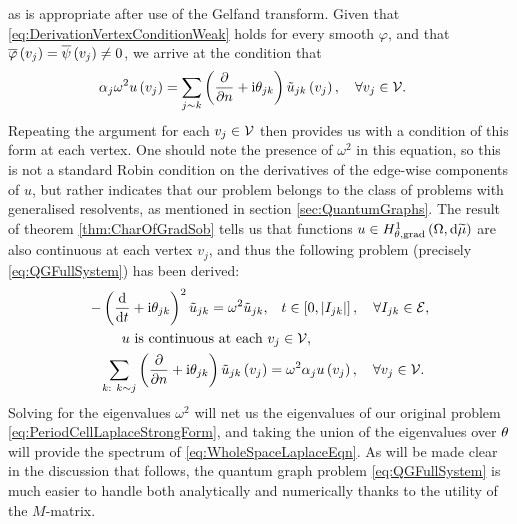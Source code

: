 as is appropriate after use of the Gelfand transform.
Given that \eqref{eq:DerivationVertexConditionWeak} holds for every smooth $\varphi$, and that $\overline{\varphi}\left( v_j \right)=\overline{\psi}\left( v_j \right)\neq 0$, we arrive at the condition that
\begin{align*}
	\alpha_j\omega^2 u\left( v_j \right) &= \sum_{j\sim k}\left( \dfrac{\partial }{\partial n} + \mathrm{i}\theta_{jk} \right)\tilde{u}_{jk}\left( v_j \right), \quad \forall v_j \in \mathcal{V}.
\end{align*}
Repeating the argument for each $v_j\in \mathcal{V}$ then provides us with a condition of this form at each vertex.
One should note the presence of $\omega^2$ in this equation, so this is not a standard Robin condition on the derivatives of the edge-wise components of $u$, but rather indicates that our problem belongs to the class of problems with generalised resolvents, as mentioned in section \ref{sec:QuantumGraphs}.
The result of theorem \ref{thm:CharOfGradSob} tells us that functions $u\in H^1_{\theta, \mathrm{grad}}\left( \Omega, \mathrm{d}\widetilde{\mu} \right)$ are also continuous at each vertex $v_j$, and thus the following problem (precisely \eqref{eq:QGFullSystem}) has been derived:
\begin{align*}
	-\left( \dfrac{\mathrm{d}}{\mathrm{d}t} + \mathrm{i}\theta_{jk} \right)^2 \tilde{u}_{jk} = \omega^2 \tilde{u}_{jk}, &\quad t\in\left[ 0,\left\lvert I_{jk} \right\rvert \right], \quad \forall I_{jk}\in \mathcal{E}, \\
	u \text{ is continuous at each } &v_j \in \mathcal{V}, \\
	\sum_{k: \ k\sim j}\left( \dfrac{\partial }{\partial n} + \mathrm{i}\theta_{jk} \right)\tilde{u}_{jk}\left( v_j \right) &= \omega^2\alpha_{j}u\left( v_j \right),  \quad \forall v_j \in \mathcal{V}.
\end{align*}
Solving for the eigenvalues $\omega^2$ will net us the eigenvalues of our original problem \eqref{eq:PeriodCellLaplaceStrongForm}, and taking the union of the eigenvalues over $\theta$ will provide the spectrum of \eqref{eq:WholeSpaceLaplaceEqn}.
As will be made clear in the discussion that follows, the quantum graph problem \eqref{eq:QGFullSystem} is much easier to handle both analytically and numerically thanks to the utility of the $M$-matrix.